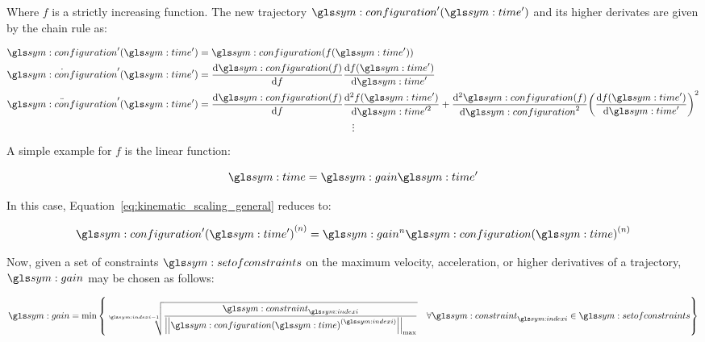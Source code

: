			Where $f$ is a strictly increasing function. The new trajectory
			$\configuration'(\timesym')$ and its higher derivates are given by
			the chain rule as:

			\begin{align}
				\begin{split}
					\configuration'(\timesym') &= \configuration(f(\timesym'))\\
					\dot{\configuration}'(\timesym') &=
						\frac
						{%
							\der \configuration(f)
						}
						{%
							\der f
						}
						\frac
						{%
							\der f(\timesym')
						}
						{%
							\der \timesym'
						}\\
					\ddot{\configuration}'(\timesym') &=
						\frac
						{%
							\der \configuration(f)
						}
						{%
							\der f
						}
						\frac
						{%
							\der^2 f(\timesym')
						}
						{%
							\der \timesym'^2
						}
						+
						\frac
						{%
							\der^2 \configuration(f)
						}
						{%
							\der \configuration^2
						}
						{%
							\left(
								\frac
								{%
									\der f(\timesym')
								}
								{%
									\der \timesym'
								}
							\right)
						}^2\\
					\label{eq:kinematic_scaling_general}
				\end{split}
			\end{align}
			\[
				\vdots
			\]

			A simple example for $f$ is the linear function:

			\begin{equation}
				\timesym = \gain\timesym'
				\label{eq:linear_time_scaling}
			\end{equation}

			In this case, Equation~\ref{eq:kinematic_scaling_general} reduces
			to:

			\begin{equation}
				\tdern{\configuration'(\timesym')}{n} = \gain^{n}
					\tdern{\configuration(\timesym)}{n}
			\end{equation}

			Now, given a set of constraints $\setofconstraints$ on the maximum
			velocity, acceleration, or higher derivatives of a trajectory,
			$\gain$ may be chosen as follows:

			\begin{equation}
				\gain = \min
					\left\{
						\sqrt[\indexi - 1]
						{%
							\frac
							{%
								\constraint_{\indexi}
							}
							{%
									\norm
									{%
										\tdern{\configuration(\timesym)}{\indexi}
									}_{\max}
							}
						}
						\quad
						\forall \constraint_{\indexi} \in \setofconstraints
					\right\}
			\end{equation}

